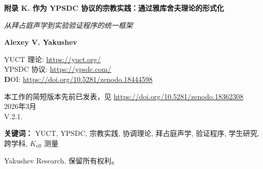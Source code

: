 \documentclass[12pt,a4paper]{article}
\begin{document}
	
	\begin{titlepage}
		\begin{center}
			\vspace*{0cm}
			
			\Huge\textbf{附录 K. 作为 YPSDC 协议的宗教实践：通过雅库舍夫理论的形式化}
			
			\vspace{1cm}
			
			\small\textit{从拜占庭声学到实验验证程序的统一框架}
			
			\vspace{0.5cm}
			
			\small\textbf{Alexey V. Yakushev}
			
			\vspace{0cm}
			
			YUCT 理论: \url{https://yuct.org/}\\
			YPSDC 协议: \url{https://ypsdc.com/}\\
			
			
			\vspace{2cm}
			\textbf DOI: \url{https://doi.org/10.5281/zenodo.18444598}\\
			
			\vspace{1cm}
			
			\vspace{0cm}
			\large 
			本工作的简短版本先前已发表，见 \url{https://doi.org/10.5281/zenodo.18362308}\\
			\vspace{1cm}
			2026年3月 \\ \large V.2.1.
			\newpage
			\begin{abstract}
				\noindent
				本文档通过雅库舍夫统一协调理论（YUCT）和 YPSDC（雅库舍夫同步分布式协调协议）的视角，对宗教实践进行了全面的形式化。第一部分展示了宗教仪式如何作为使用预分发字典的高度优化协调协议运行，其中拜占庭教堂声学作为建筑优化协调效率的范例。第二部分概述了 YUCT 框架的极端统一力量，并提出了一个详细的实验验证研究计划，强调学生研究作为科学验证的基石。该框架提供了可测量的指标（$K_{\mathrm{eff}}$）、可检验的预测以及从物理学、生物学到社会学和宗教研究的跨学科应用。
			\end{abstract}
			
			\vspace{0cm}
			
			\noindent
			\small\textbf{关键词：} YUCT, YPSDC, 宗教实践, 协调理论, 拜占庭声学, 验证程序, 学生研究, 跨学科, $K_{\mathrm{eff}}$ 测量
			
			\vspace{0.5cm}
			
			\noindent
			 Yakushev Research. 保留所有权利。
		\end{center}
	\end{titlepage}
	
\end{document}
